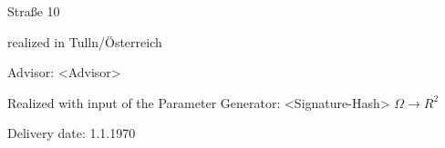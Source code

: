 \vspace*{-6mm}

\begin{large} 
\begin{center}
Straße 10
\end{center}
\end{large} 

\vspace*{-6mm}

\begin{large} 
\begin{center}
realized in Tulln/Österreich
\end{center}
\end{large} 

\vspace*{5mm}

\begin{large} 
\begin{center}
Advisor: <Advisor>
\end{center}
\end{large} 

\begin{large} 
\begin{center}
Realized with input of the Parameter Generator: <Signature-Hash> $\Omega \longrightarrow R^2$
\end{center}
\end{large} 



\vspace*{-6mm}

\begin{large} 
\begin{center}
Delivery date: 1.1.1970
\end{center}
\end{large} 


\pagestyle{empty} %

